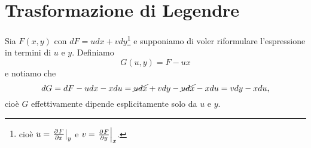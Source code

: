 \section{Trasformazione di Legendre}
Sia $F(x,y)$ con $dF=udx+vdy$\footnote{cio\`e $u=\ppb xFy$ e $v=\ppb yFx$.} e supponiamo di voler riformulare l'espressione in termini di $u$ e $y$. Definiamo 
\[G(u,y)=F-ux\]
e notiamo che
\[dG=dF-udx-xdu=\cancel{udx}+vdy-\cancel{udx}-xdu=vdy-xdu,\]
cio\`e $G$ effettivamente dipende esplicitamente solo da $u$ e $y$.
